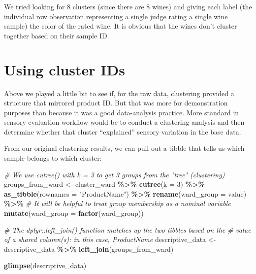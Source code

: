 \documentclass[
]{book}
\newenvironment{Shaded}{\begin{snugshade}}{\end{snugshade}}
\newcommand{\AttributeTok}[1]{\textcolor[rgb]{0.13,0.29,0.53}{#1}}
\newcommand{\CommentTok}[1]{\textcolor[rgb]{0.56,0.35,0.01}{\textit{#1}}}
\newcommand{\DecValTok}[1]{\textcolor[rgb]{0.00,0.00,0.81}{#1}}
\newcommand{\FunctionTok}[1]{\textcolor[rgb]{0.13,0.29,0.53}{\textbf{#1}}}
\newcommand{\NormalTok}[1]{#1}
\newcommand{\OtherTok}[1]{\textcolor[rgb]{0.56,0.35,0.01}{#1}}
\newcommand{\SpecialCharTok}[1]{\textcolor[rgb]{0.81,0.36,0.00}{\textbf{#1}}}
\newcommand{\StringTok}[1]{\textcolor[rgb]{0.31,0.60,0.02}{#1}}
\begin{document}
We tried looking for 8 clusters (since there are 8 wines) and giving each label (the individual row observation representing a single judge rating a single wine sample) the color of the rated wine. It is obvious that the wines don't cluster together based on their sample ID.

\section{Using cluster IDs}\label{using-cluster-ids}

Above we played a little bit to see if, for the raw data, clustering provided a structure that mirrored product ID. But that was more for demonstration purposes than because it was a good data-analysis practice. More standard in sensory evaluation workflow would be to conduct a clustering analysis and then determine whether that cluster ``explained'' sensory variation in the base data.

From our original clustering results, we can pull out a tibble that tells us which sample belongs to which cluster:

\begin{Shaded}
\begin{Highlighting}[]
\CommentTok{\# We use \textasciigrave{}cutree()\textasciigrave{} with \textasciigrave{}k = 3\textasciigrave{} to get 3 groups from the "tree" (clustering)}
\NormalTok{groups\_from\_ward }\OtherTok{\textless{}{-}} 
\NormalTok{  cluster\_ward }\SpecialCharTok{\%\textgreater{}\%}
  \FunctionTok{cutree}\NormalTok{(}\AttributeTok{k =} \DecValTok{3}\NormalTok{) }\SpecialCharTok{\%\textgreater{}\%}
  \FunctionTok{as\_tibble}\NormalTok{(}\AttributeTok{rownames =} \StringTok{"ProductName"}\NormalTok{) }\SpecialCharTok{\%\textgreater{}\%}
  \FunctionTok{rename}\NormalTok{(}\AttributeTok{ward\_group =}\NormalTok{ value) }\SpecialCharTok{\%\textgreater{}\%}
  \CommentTok{\# It will be helpful to treat group membership as a nominal variable}
  \FunctionTok{mutate}\NormalTok{(}\AttributeTok{ward\_group =} \FunctionTok{factor}\NormalTok{(ward\_group))}

\CommentTok{\# The \textasciigrave{}dplyr::left\_join()\textasciigrave{} function matches up the two tibbles based on the}
\CommentTok{\# value of a shared column(s): in this case, \textasciigrave{}ProductName\textasciigrave{}}
\NormalTok{descriptive\_data }\OtherTok{\textless{}{-}} 
\NormalTok{  descriptive\_data }\SpecialCharTok{\%\textgreater{}\%}
  \FunctionTok{left\_join}\NormalTok{(groups\_from\_ward)}

\FunctionTok{glimpse}\NormalTok{(descriptive\_data)}
\end{Highlighting}
\end{Shaded}
\end{document}
